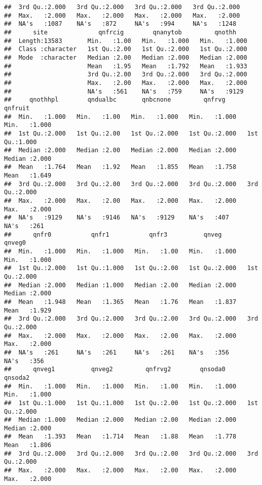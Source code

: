 \documentclass[
]{article}
\begin{document}
\begin{verbatim}
##  3rd Qu.:2.000   3rd Qu.:2.000   3rd Qu.:2.000   3rd Qu.:2.000  
##  Max.   :2.000   Max.   :2.000   Max.   :2.000   Max.   :2.000  
##  NA's   :1087    NA's   :872     NA's   :994     NA's   :1248   
##      site              qnfrcig        qnanytob         qnothh     
##  Length:13583       Min.   :1.00   Min.   :1.000   Min.   :1.000  
##  Class :character   1st Qu.:2.00   1st Qu.:2.000   1st Qu.:2.000  
##  Mode  :character   Median :2.00   Median :2.000   Median :2.000  
##                     Mean   :1.95   Mean   :1.792   Mean   :1.933  
##                     3rd Qu.:2.00   3rd Qu.:2.000   3rd Qu.:2.000  
##                     Max.   :2.00   Max.   :2.000   Max.   :2.000  
##                     NA's   :561    NA's   :759     NA's   :9129   
##     qnothhpl        qndualbc       qnbcnone         qnfrvg         qnfruit     
##  Min.   :1.000   Min.   :1.00   Min.   :1.000   Min.   :1.000   Min.   :1.000  
##  1st Qu.:2.000   1st Qu.:2.00   1st Qu.:2.000   1st Qu.:2.000   1st Qu.:1.000  
##  Median :2.000   Median :2.00   Median :2.000   Median :2.000   Median :2.000  
##  Mean   :1.764   Mean   :1.92   Mean   :1.855   Mean   :1.758   Mean   :1.649  
##  3rd Qu.:2.000   3rd Qu.:2.00   3rd Qu.:2.000   3rd Qu.:2.000   3rd Qu.:2.000  
##  Max.   :2.000   Max.   :2.00   Max.   :2.000   Max.   :2.000   Max.   :2.000  
##  NA's   :9129    NA's   :9146   NA's   :9129    NA's   :407     NA's   :261    
##      qnfr0           qnfr1           qnfr3          qnveg           qnveg0     
##  Min.   :1.000   Min.   :1.000   Min.   :1.00   Min.   :1.000   Min.   :1.000  
##  1st Qu.:2.000   1st Qu.:1.000   1st Qu.:2.00   1st Qu.:2.000   1st Qu.:2.000  
##  Median :2.000   Median :1.000   Median :2.00   Median :2.000   Median :2.000  
##  Mean   :1.948   Mean   :1.365   Mean   :1.76   Mean   :1.837   Mean   :1.929  
##  3rd Qu.:2.000   3rd Qu.:2.000   3rd Qu.:2.00   3rd Qu.:2.000   3rd Qu.:2.000  
##  Max.   :2.000   Max.   :2.000   Max.   :2.00   Max.   :2.000   Max.   :2.000  
##  NA's   :261     NA's   :261     NA's   :261    NA's   :356     NA's   :356    
##      qnveg1          qnveg2         qnfrvg2        qnsoda0         qnsoda2     
##  Min.   :1.000   Min.   :1.000   Min.   :1.00   Min.   :1.000   Min.   :1.000  
##  1st Qu.:1.000   1st Qu.:1.000   1st Qu.:2.00   1st Qu.:2.000   1st Qu.:2.000  
##  Median :1.000   Median :2.000   Median :2.00   Median :2.000   Median :2.000  
##  Mean   :1.393   Mean   :1.714   Mean   :1.88   Mean   :1.778   Mean   :1.806  
##  3rd Qu.:2.000   3rd Qu.:2.000   3rd Qu.:2.00   3rd Qu.:2.000   3rd Qu.:2.000  
##  Max.   :2.000   Max.   :2.000   Max.   :2.00   Max.   :2.000   Max.   :2.000  

\end{verbatim}
\end{document}
